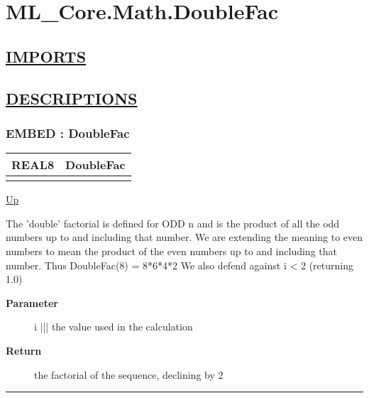 \chapter*{ML\_Core.Math.DoubleFac}
\hypertarget{ecldoc:toc:ML_Core.Math.DoubleFac}{}

\section*{\underline{IMPORTS}}

\section*{\underline{DESCRIPTIONS}}
\subsection*{EMBED : DoubleFac}
\hypertarget{ecldoc:ml_core.math.doublefac}{}

{\renewcommand{\arraystretch}{1.5}
\begin{tabularx}{\textwidth}{|>{\raggedright\arraybackslash}l|X|}
\hline
\hspace{0pt}REAL8 & DoubleFac \\
\hline
\multicolumn{2}{|>{\raggedright\arraybackslash}X|}{\hspace{0pt}(INTEGER2 i)} \\
\hline
\end{tabularx}
}

\hyperlink{ecldoc:toc:ML_Core/Math}{Up}

\par
The 'double' factorial is defined for ODD n and is the product of all the odd numbers up to and including that number. We are extending the meaning to even numbers to mean the product of the even numbers up to and including that number. Thus DoubleFac(8) = 8*6*4*2 We also defend against i < 2 (returning 1.0)

\par
\begin{description}
\item [\textbf{Parameter}] i ||| the value used in the calculation
\item [\textbf{Return}] the factorial of the sequence, declining by 2
\end{description}

\rule{\textwidth}{0.4pt}
